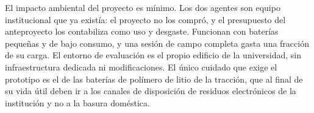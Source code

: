 El impacto ambiental del proyecto es mínimo. Los dos agentes son equipo institucional que ya existía: el proyecto no los compró, y el presupuesto del anteproyecto los contabiliza como uso y desgaste. Funcionan con baterías pequeñas y de bajo consumo, y una sesión de campo completa gasta una fracción de su carga. El entorno de evaluación es el propio edificio de la universidad, sin infraestructura dedicada ni modificaciones. El único cuidado que exige el prototipo es el de las baterías de polímero de litio de la tracción, que al final de su vida útil deben ir a los canales de disposición de residuos electrónicos de la institución y no a la basura doméstica.



